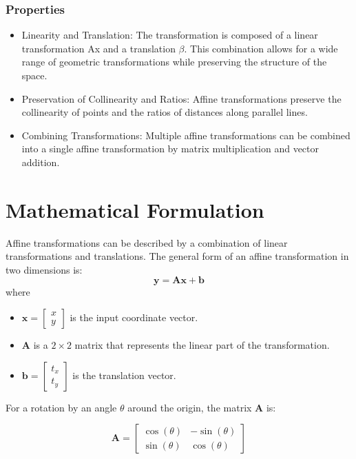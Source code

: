\documentclass[conference]{IEEEtran}
\begin{document}
\subsubsection{Properties}
\begin{itemize}
  \item Linearity and Translation:  The transformation is composed of a linear transformation  Ax and a translation $\beta$.  This combination allows for a wide range of geometric transformations while preserving the structure of the space.

  \item Preservation of Collinearity and Ratios:  Affine transformations preserve the collinearity of points and the ratios of distances along parallel lines.

  \item Combining Transformations:  Multiple affine transformations can be combined into a single affine transformation by matrix multiplication and vector addition.
\end{itemize}

\section*{Mathematical Formulation}
Affine transformations can be described by a combination of linear transformations and translations. The general form of an affine transformation in two dimensions is:
\[
\mathbf{y} = \mathbf{A}\mathbf{x} + \mathbf{b}
\]
where
\begin{itemize}
    \item \(\mathbf{x} = \begin{bmatrix} x \\ y \end{bmatrix}\) is the input coordinate vector.\\
    \item \(\mathbf{A}\) is a \(2 \times 2\) matrix that represents the linear part of the transformation.\\
    \item \(\mathbf{b} = \begin{bmatrix} t_x \\ t_y \end{bmatrix}\) is the translation vector.\\
\end{itemize}

For a rotation by an angle \(\theta\) around the origin, the matrix \(\mathbf{A}\) is:

\[
\mathbf{A} = \begin{bmatrix} \cos(\theta) & -\sin(\theta) \\ \sin(\theta) & \cos(\theta) \end{bmatrix}
\]
\end{document}
